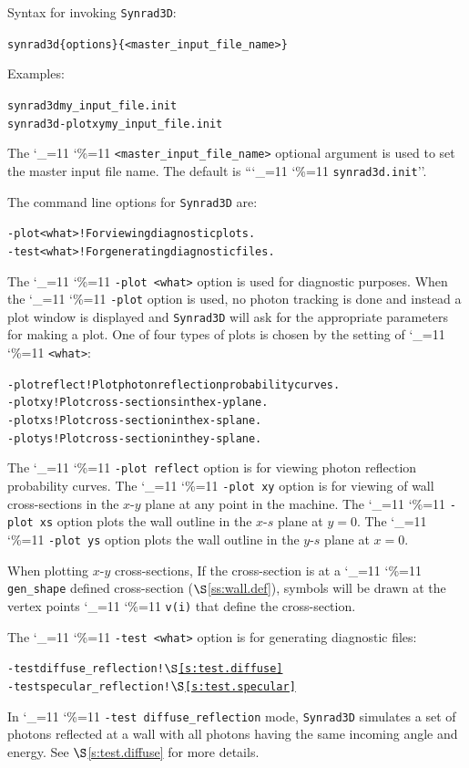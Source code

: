 \documentclass[11pt]{article}
\newcommand{\sref}[1]{$\S$\ref{#1}}
\newcommand{\srthree}{\texttt{Synrad3D}\xspace}
\newcommand\ttcmd{\begingroup\catcode`\_=11 \catcode`\%=11 \dottcmd}
\newcommand\dottcmd[1]{\texttt{#1}\endgroup}
\newcommand{\vn}{\ttcmd}
\newlength{\ExBeg}
\newlength{\ExEnd}
\newenvironment{example}
  {\vspace{\ExBeg} \begin{alltt}}
  {\end{alltt} \vspace{\ExEnd}}
\begin{document}
Syntax for invoking \srthree:
\begin{example}
  synrad3d \{options\} \{<master_input_file_name>\}
\end{example}
Examples:
\begin{example}
  synrad3d my_input_file.init
  synrad3d -plot xy  my_input_file.init
\end{example}

The \vn{<master_input_file_name>} optional argument is used to set the
master input file name. The default is ``\vn{synrad3d.init}''. 

The command line options for \srthree are:
\begin{example}
  -plot <what>  ! For viewing diagnostic plots.
  -test <what>  ! For generating diagnostic files.
\end{example}

The \vn{-plot <what>} option is used for diagnostic purposes. When the
\vn{-plot} option is used, no photon tracking is done and instead a
plot window is displayed and \srthree will ask for the appropriate
parameters for making a plot. One of four types of plots is chosen by
the setting of \vn{<what>}:
\begin{example}
  -plot reflect ! Plot photon reflection probability curves.
  -plot xy      ! Plot cross-sections in the x-y plane.
  -plot xs      ! Plot cross-section in the x-s plane.
  -plot ys      ! Plot cross-section in the y-s plane.
\end{example}

The \vn{-plot reflect} option is for viewing photon reflection
probability curves. The \vn{-plot xy} option is for viewing of wall
cross-sections in the $x$-$y$ plane at any point in the machine. The
\vn{-plot xs} option plots the wall outline in the $x$-$s$ plane at $y
= 0$. The \vn{-plot ys} option plots the wall outline in the $y$-$s$
plane at $x = 0$.

When plotting $x$-$y$ cross-sections, If the cross-section is at a
\vn{gen_shape} defined cross-section (\sref{ss:wall.def}), symbols
will be drawn at the vertex points \vn{v(i)} that define the
cross-section.

The \vn{-test <what>} option is for generating diagnostic
files:
\begin{example}
  -test diffuse_reflection     ! \sref{s:test.diffuse}
  -test specular_reflection    ! \sref{s:test.specular}
\end{example}

In \vn{-test diffuse_reflection} mode, \srthree simulates a set of photons
reflected at a wall with all photons having the same incoming angle
and energy. See \sref{s:test.diffuse} for more details.
\end{document}
